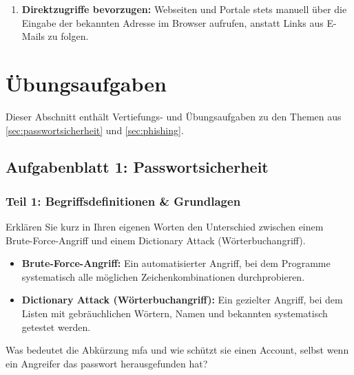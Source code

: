 \documentclass[12pt,a4paper]{article}
\begin{document}
\begin{enumerate}
    \item \textbf{Direktzugriffe bevorzugen:} Webseiten und Portale stets manuell über die \mbox{Eingabe} der bekannten Adresse im Browser aufrufen, anstatt Links aus E-Mails zu folgen. \cite{cisaphishingpostcard}\cite{bacsphishing}
\end{enumerate}

\newpage
\section{Übungsaufgaben}
\label{sec:aufgaben}

Dieser Abschnitt enthält Vertiefungs- und Übungsaufgaben zu den Themen aus \mbox{\cref{sec:passwortsicherheit}} und \mbox{\cref{sec:phishing}}.

\subsection{Aufgabenblatt 1: Passwortsicherheit}
\label{subsec:aufgaben_passwort}

\subsubsection{Teil 1: Begriffsdefinitionen \& Grundlagen}

\begin{taskbox}
Erklären Sie kurz in Ihren eigenen Worten den Unterschied zwischen einem \newline Brute-Force-Angriff und einem Dictionary Attack (Wörterbuchangriff).
\end{taskbox}

\begin{solutionbox}
\begin{itemize}
    \item \textbf{Brute-Force-Angriff:} Ein automatisierter Angriff, bei dem Programme \mbox{systematisch} alle möglichen Zeichenkombinationen durchprobieren.
    \item \textbf{Dictionary Attack (Wörterbuchangriff):} Ein gezielter Angriff, bei dem Listen mit gebräuchlichen Wörtern, Namen und bekannten  \mbox{systematisch} getestet werden.
\end{itemize}
\end{solutionbox}

\begin{taskbox}
Was bedeutet die Abkürzung \gls{mfa} und wie schützt sie einen Account, selbst wenn ein Angreifer das \gls{passwort} herausgefunden hat?
\end{taskbox}
\end{document}
